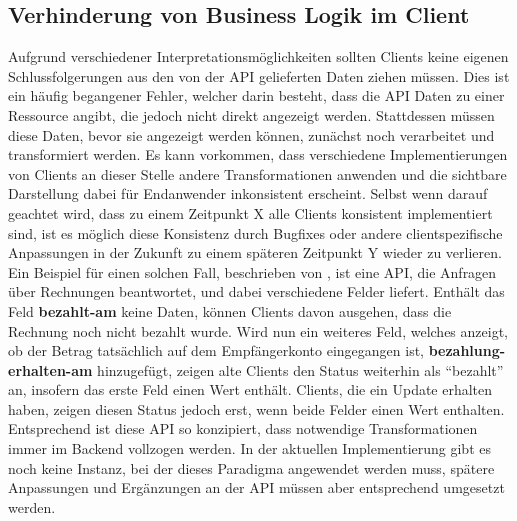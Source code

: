 \subsection{Verhinderung von Business Logik im Client}\label{subsec:api_client_no_business_logic}
Aufgrund verschiedener Interpretationsmöglichkeiten sollten Clients keine eigenen Schlussfolgerungen aus den von der API gelieferten Daten ziehen müssen. Dies ist ein häufig begangener Fehler, welcher darin besteht, dass die API Daten zu einer Ressource angibt, die jedoch nicht direkt angezeigt werden. Stattdessen müssen diese Daten, bevor sie angezeigt werden können, zunächst noch verarbeitet und transformiert werden. Es kann vorkommen, dass verschiedene Implementierungen von Clients an dieser Stelle andere Transformationen anwenden und die sichtbare Darstellung dabei für Endanwender inkonsistent erscheint. Selbst wenn darauf geachtet wird, dass zu einem Zeitpunkt X alle Clients konsistent implementiert sind, ist es möglich diese Konsistenz durch Bugfixes oder andere clientspezifische Anpassungen in der Zukunft zu einem späteren Zeitpunkt Y wieder zu verlieren. Ein Beispiel für einen solchen Fall, beschrieben von  \parencite[vgl.][]{sturgeon_2017}, ist eine API, die Anfragen über Rechnungen beantwortet, und dabei verschiedene Felder liefert. Enthält das Feld \textbf{bezahlt-am} keine Daten, können Clients davon ausgehen, dass die Rechnung noch nicht bezahlt wurde. Wird nun ein weiteres Feld, welches anzeigt, ob der Betrag tatsächlich auf dem Empfängerkonto eingegangen ist, \textbf{bezahlung-erhalten-am} hinzugefügt, zeigen alte Clients den Status weiterhin als \enquote{bezahlt} an, insofern das erste Feld einen Wert enthält. Clients, die ein Update erhalten haben, zeigen diesen Status jedoch erst, wenn beide Felder einen Wert enthalten.
Entsprechend ist diese API so konzipiert, dass notwendige Transformationen immer im Backend vollzogen werden. In der aktuellen Implementierung gibt es noch keine Instanz, bei der dieses Paradigma angewendet werden muss, spätere Anpassungen und Ergänzungen an der API müssen aber entsprechend umgesetzt werden.

